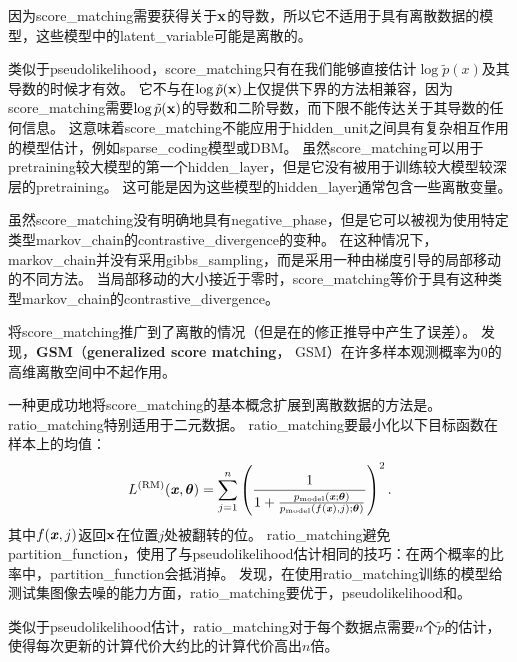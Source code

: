 
因为\gls{score_matching}需要获得关于$\mathbf{x}$的导数，所以它不适用于具有离散数据的模型，这些模型中的\gls{latent_variable}可能是离散的。


类似于\gls{pseudolikelihood}，\gls{score_matching}只有在我们能够直接估计$\log \tilde{p}(x)$及其导数的时候才有效。
它不与在$\log \tilde{p}(\mathbf{x})$上仅提供下界的方法相兼容，因为\gls{score_matching}需要$\log \tilde{p}(\mathbf{x})$的导数和二阶导数，而下限不能传达关于其导数的任何信息。
这意味着\gls{score_matching}不能应用于\gls{hidden_unit}之间具有复杂相互作用的模型估计，例如\gls{sparse_coding}模型或\gls{DBM}。
虽然\gls{score_matching}可以用于\gls{pretraining}较大模型的第一个\gls{hidden_layer}，但是它没有被用于训练较大模型较深层的\gls{pretraining}。
这可能是因为这些模型的\gls{hidden_layer}通常包含一些离散变量。


虽然\gls{score_matching}没有明确地具有\gls{negative_phase}，但是它可以被视为使用特定类型\gls{markov_chain}的\gls{contrastive_divergence}的变种\citep{Hyvarinen-2007b}。
在这种情况下，\gls{markov_chain}并没有采用\gls{gibbs_sampling}，而是采用一种由梯度引导的局部移动的不同方法。
当局部移动的大小接近于零时，\gls{score_matching}等价于具有这种类型\gls{markov_chain}的\gls{contrastive_divergence}。


\cite{Lyu09}将\gls{score_matching}推广到了离散的情况（但是在\cite{Marlin10Inductive-small}的修正推导中产生了误差）。
\cite{Marlin10Inductive-small}发现，\textbf{\gls{GSM}}（\textbf{generalized score matching}， GSM）在许多样本观测概率为$0$的高维离散空间中不起作用。


一种更成功地将\gls{score_matching}的基本概念扩展到离散数据的方法是\citep{Hyvarinen-2007}。
\gls{ratio_matching}特别适用于二元数据。
\gls{ratio_matching}要最小化以下目标函数在样本上的均值：
\begin{equation}
	L^{(\text{RM})} (\boldsymbol{\mathit{x}}, \boldsymbol{\theta}) = \sum_{j=1}^n \left( 
	\frac{1}{ 1 + \frac{ p_{\text{model}}(\boldsymbol{\mathit{x}}; \boldsymbol{\theta}) }{ p_{\text{model}}(f(\boldsymbol{\mathit{x}}), j); \boldsymbol{\theta}) } } 
\right)^2.
\end{equation}
其中$f(\boldsymbol{\mathit{x}}, j)$返回$\mathbf{x}$在位置$j$处被翻转的位。
\gls{ratio_matching}避免\gls{partition_function}，使用了与\gls{pseudolikelihood}估计相同的技巧：在两个概率的比率中，\gls{partition_function}会抵消掉。
\cite{Marlin10Inductive-small}发现，在使用\gls{ratio_matching}训练的模型给测试集图像去噪的能力方面，\gls{ratio_matching}要优于，\gls{pseudolikelihood}和。


类似于\gls{pseudolikelihood}估计，\gls{ratio_matching}对于每个数据点需要$n$个$\tilde{p}$的估计，使得每次更新的计算代价大约比的计算代价高出$n$倍。


